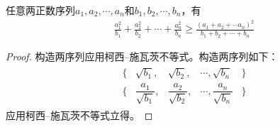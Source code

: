 \begin{lemma}\label{lemma:titu}
  任意两正数序列$a_1,a_2,\cdots,a_n$和$b_1,b_2,\cdots,b_n$，有
  \begin{align*}
    \frac{a_1^2}{b_1} + \frac{a_2^2}{b_2} + \cdots + \frac{a_n^2}{b_n} \ge
    \frac{\left(a_1+a_2+\cdots a_n\right)^2}{b_1+b_2+\cdots+b_n}
  \end{align*}
\end{lemma}
\begin{proof}
  构造两序列应用柯西--施瓦茨不等式。构造两序列如下：
  \begin{align*}
    \begin{matrix}%
      \Big\{ &\sqrt{b_1}, &\sqrt{b_2},&\cdots,\sqrt{b_n} &\Big\}\\
      \Big\{ &\dfrac{a_1}{\sqrt{b_1}}, &\dfrac{a_2}{\sqrt{b_2}},&\cdots,\dfrac{a_n}{\sqrt{b_n}} & \Big\}
    \end{matrix}
  \end{align*}
  应用柯西--施瓦茨不等式立得。
\end{proof}